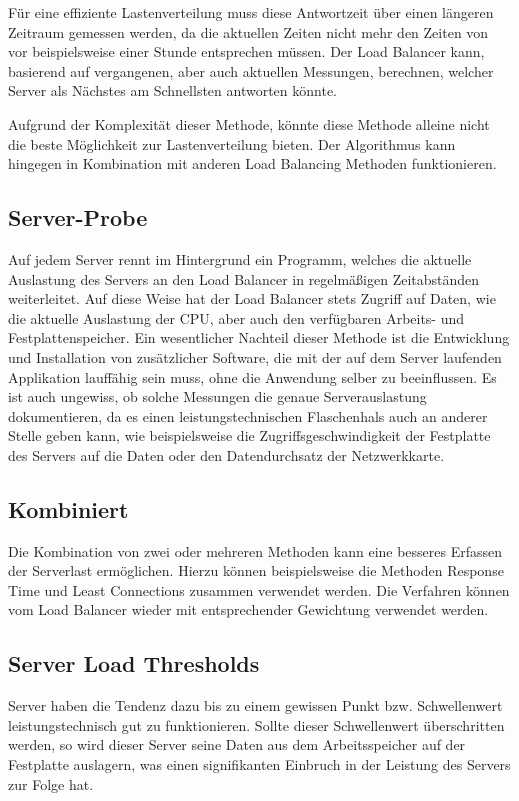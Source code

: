 Für eine effiziente Lastenverteilung muss diese Antwortzeit über einen längeren Zeitraum gemessen werden, da die aktuellen Zeiten nicht mehr den Zeiten von vor beispielsweise einer Stunde entsprechen müssen. Der Load Balancer kann, basierend auf vergangenen, aber auch aktuellen Messungen, berechnen, welcher Server als Nächstes am Schnellsten antworten könnte.

Aufgrund der Komplexität dieser Methode, könnte diese Methode alleine nicht die beste Möglichkeit zur Lastenverteilung bieten. Der Algorithmus kann hingegen in Kombination mit anderen Load Balancing Methoden funktionieren. \cite{LoadBalancing2}

\subsection{Server-Probe}
\label{sec:Server-Probe}
Auf jedem Server rennt im Hintergrund ein Programm, welches die aktuelle Auslastung des Servers an den Load Balancer in regelmäßigen Zeitabständen weiterleitet. Auf diese Weise hat der Load Balancer stets Zugriff auf Daten, wie die aktuelle Auslastung der CPU, aber auch den verfügbaren Arbeits- und Festplattenspeicher.
Ein wesentlicher Nachteil dieser Methode ist die Entwicklung und Installation von zusätzlicher Software, die mit der auf dem Server laufenden Applikation lauffähig sein muss, ohne die Anwendung selber zu beeinflussen. Es ist auch ungewiss, ob solche Messungen die genaue Serverauslastung dokumentieren, da es einen leistungstechnischen Flaschenhals auch an anderer Stelle geben kann, wie beispielsweise die Zugriffsgeschwindigkeit der Festplatte des Servers auf die Daten oder den Datendurchsatz der Netzwerkkarte. \cite{LoadBalancing2}

\subsection{Kombiniert}
\label{sec:Kombiniert}
Die Kombination von zwei oder mehreren Methoden kann eine besseres Erfassen der Serverlast ermöglichen. Hierzu können beispielsweise die Methoden Response Time und Least Connections zusammen verwendet werden. Die Verfahren können vom Load Balancer wieder mit entsprechender Gewichtung verwendet werden. \cite{LoadBalancing2}

\subsection{Server Load Thresholds}
\label{sec:Server Load Thresholds}
Server haben die Tendenz dazu bis zu einem gewissen Punkt bzw. Schwellenwert leistungstechnisch gut zu funktionieren. Sollte dieser Schwellenwert überschritten werden, so wird dieser Server seine Daten aus dem Arbeitsspeicher auf der Festplatte auslagern, was einen signifikanten Einbruch in der Leistung des Servers zur Folge hat.

